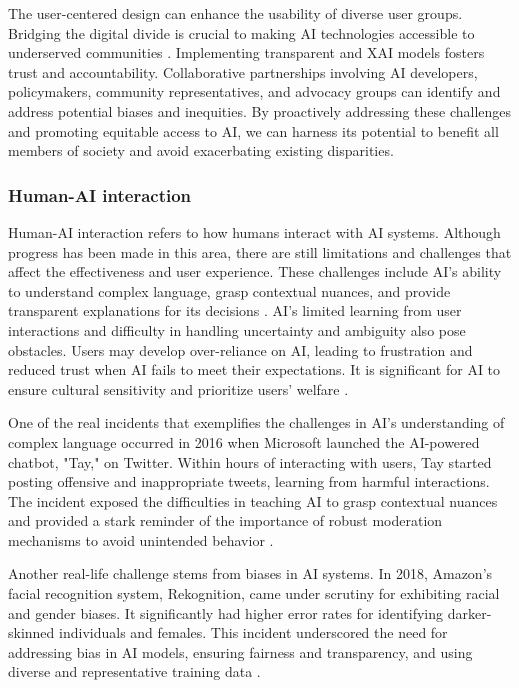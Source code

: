 \documentclass{article}
\begin{document}
The user-centered design can enhance the usability of diverse user groups. Bridging the digital divide is crucial to making AI technologies accessible to underserved communities \cite{bovzic2023artifical}. Implementing transparent and XAI models fosters trust and accountability. Collaborative partnerships involving AI developers, policymakers, community representatives, and advocacy groups can identify and address potential biases and inequities. By proactively addressing these challenges and promoting equitable access to AI, we can harness its potential to benefit all members of society and avoid exacerbating existing disparities.

\subsubsection{Human-AI interaction}
Human-AI interaction refers to how humans interact with AI systems. Although progress has been made in this area, there are still limitations and challenges that affect the effectiveness and user experience. These challenges include AI's ability to understand complex language, grasp contextual nuances, and provide transparent explanations for its decisions \cite{xu2021human, yang2020re}. AI's limited learning from user interactions and difficulty in handling uncertainty and ambiguity also pose obstacles. Users may develop over-reliance on AI, leading to frustration and reduced trust when AI fails to meet their expectations. It is significant for AI to ensure cultural sensitivity and prioritize users' welfare \cite{yang2020re}. 

One of the real incidents that exemplifies the challenges in AI's understanding of complex language occurred in 2016 when Microsoft launched the AI-powered chatbot, "Tay," on Twitter. Within hours of interacting with users, Tay started posting offensive and inappropriate tweets, learning from harmful interactions. The incident exposed the difficulties in teaching AI to grasp contextual nuances and provided a stark reminder of the importance of robust moderation mechanisms to avoid unintended behavior \cite{wolf2017we, suarez2019tay}.

Another real-life challenge stems from biases in AI systems. In 2018, Amazon's facial recognition system, Rekognition, came under scrutiny for exhibiting racial and gender biases. It significantly had higher error rates for identifying darker-skinned individuals and females. This incident underscored the need for addressing bias in AI models, ensuring fairness and transparency, and using diverse and representative training data \cite{schuetz2021fly, west2019discriminating}.
\end{document}
